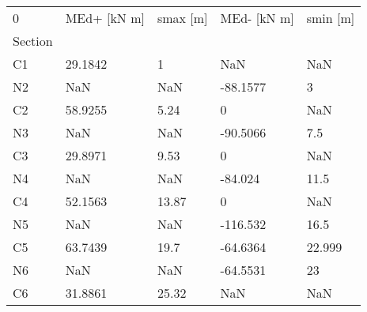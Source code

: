 \begin{tabular}{lllll}
\toprule
0 & MEd+ [kN m] & smax [m] & MEd- [kN m] & smin [m] \\
Section &             &          &             &          \\
\midrule
C1      &     29.1842 &        1 &         NaN &      NaN \\
N2      &         NaN &      NaN &    -88.1577 &        3 \\
C2      &     58.9255 &     5.24 &           0 &      NaN \\
N3      &         NaN &      NaN &    -90.5066 &      7.5 \\
C3      &     29.8971 &     9.53 &           0 &      NaN \\
N4      &         NaN &      NaN &     -84.024 &     11.5 \\
C4      &     52.1563 &    13.87 &           0 &      NaN \\
N5      &         NaN &      NaN &    -116.532 &     16.5 \\
C5      &     63.7439 &     19.7 &    -64.6364 &   22.999 \\
N6      &         NaN &      NaN &    -64.5531 &       23 \\
C6      &     31.8861 &    25.32 &         NaN &      NaN \\
\bottomrule
\end{tabular}
